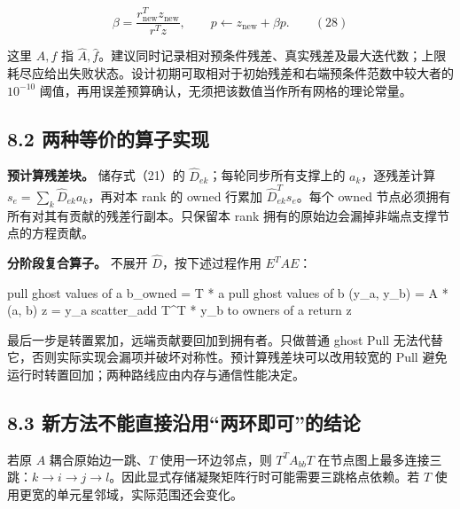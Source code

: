 \documentclass[
  11pt,
  a4paper,
]{article}
\newenvironment{Shaded}{}{}
\newcommand{\NormalTok}[1]{#1}
\begin{document}
\[
\beta=\frac{r_{\mathrm{new}}^Tz_{\mathrm{new}}}{r^Tz},\qquad
p\leftarrow z_{\mathrm{new}}+\beta p. \qquad(28)
\]

这里 \(A,f\) 指
\(\widehat A,\widehat f\)。建议同时记录相对预条件残差、真实残差及最大迭代数；上限耗尽应给出失败状态。设计初期可取相对于初始残差和右端预条件范数中较大者的
\(10^{-10}\)
阈值，再用误差预算确认，无须把该数值当作所有网格的理论常量。

\hypertarget{ux4e24ux79cdux7b49ux4ef7ux7684ux7b97ux5b50ux5b9eux73b0}{%
\subsection{8.2
两种等价的算子实现}\label{ux4e24ux79cdux7b49ux4ef7ux7684ux7b97ux5b50ux5b9eux73b0}}

\textbf{预计算残差块。} 储存式（21）的
\(\widehat D_{ek}\)；每轮同步所有支撑上的 \(a_k\)，逐残差计算
\(s_e=\sum_k\widehat D_{ek}a_k\)，再对本 rank 的 owned 行累加
\(\widehat D_{ek}^Ts_e\)。每个 owned
节点必须拥有所有对其有贡献的残差行副本。只保留本 rank
拥有的原始边会漏掉非端点支撑节点的方程贡献。

\textbf{分阶段复合算子。} 不展开 \(\widehat D\)，按下述过程作用
\(E^TAE\)：

\begin{Shaded}
\begin{Highlighting}[]
\NormalTok{pull ghost values of a}
\NormalTok{b\_owned = T * a}
\NormalTok{pull ghost values of b}
\NormalTok{(y\_a, y\_b) = A * (a, b)}
\NormalTok{z = y\_a}
\NormalTok{scatter\_add T\^{}T * y\_b to owners of a}
\NormalTok{return z}
\end{Highlighting}
\end{Shaded}

最后一步是转置累加，远端贡献要回加到拥有者。只做普通 ghost Pull
无法代替它，否则实际实现会漏项并破坏对称性。预计算残差块可以改用较宽的
Pull 避免运行时转置回加；两种路线应由内存与通信性能决定。

\hypertarget{ux65b0ux65b9ux6cd5ux4e0dux80fdux76f4ux63a5ux6cbfux7528ux4e24ux73afux5373ux53efux7684ux7ed3ux8bba}{%
\subsection{8.3
新方法不能直接沿用``两环即可''的结论}\label{ux65b0ux65b9ux6cd5ux4e0dux80fdux76f4ux63a5ux6cbfux7528ux4e24ux73afux5373ux53efux7684ux7ed3ux8bba}}

若原 \(A\) 耦合原始边一跳、\(T\) 使用一环边邻点，则 \(T^TA_{bb}T\)
在节点图上最多连接三跳：\(k\to i\to j\to l\)。因此显式存储凝聚矩阵行时可能需要三跳格点依赖。若
\(T\) 使用更宽的单元星邻域，实际范围还会变化。
\end{document}
